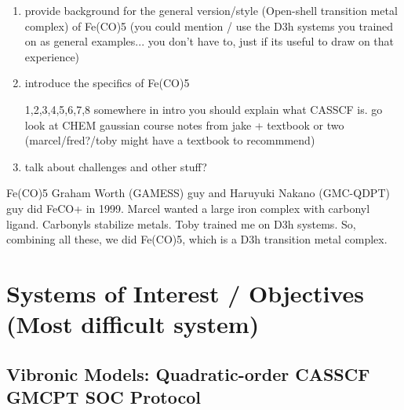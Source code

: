 \documentclass[letterpaper, 12pt, oneside]{report}
\begin{document}
\begin{enumerate}
    \item provide background for the general version/style (Open-shell transition metal complex) of Fe(CO)5 
    (you could mention / use the D3h systems you trained on as general examples... you don't have to, just if its useful to draw on that experience)
    
    \item introduce the specifics of Fe(CO)5 

    1,2,3,4,5,6,7,8
    somewhere in intro you should explain what CASSCF is.
    go look at CHEM gaussian course notes from jake + textbook or two (marcel/fred?/toby might have a textbook to recommmend)
    
    
    \item talk about challenges and other stuff?
    
\end{enumerate}

    Fe(CO)5
    Graham Worth (GAMESS) guy and Haruyuki Nakano (GMC-QDPT) guy did FeCO+ in 1999. Marcel wanted a large iron complex with carbonyl ligand. Carbonyls stabilize metals. Toby trained me on D3h systems. So, combining all these, we did Fe(CO)5, which is a D3h transition metal complex.




\section{Systems of Interest / Objectives (Most difficult system) } %


    \subsection{Vibronic Models: Quadratic-order CASSCF GMCPT SOC Protocol} %
\end{document}
